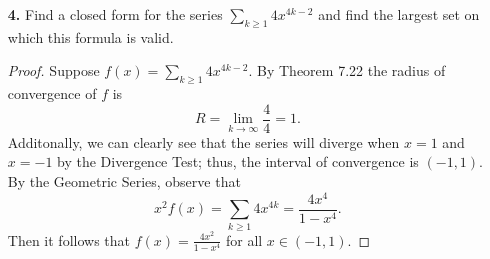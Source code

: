 \documentclass[ 12pt ]{article}
\begin{document}
\begin{enumerate}
	\item[\textbf{4.}] Find a closed form for the series $\sum_{k \geq 1} 4x^{4k - 2}$ and find the largest set on which this formula is valid.

		\begin{proof}
			Suppose $f(x) = \sum_{k \geq 1} 4x^{4k - 2}$. By Theorem 7.22 the radius of convergence of $f$ is $$R = \lim_{k \to \infty} \frac{4}{4} = 1.$$ Additonally, we can clearly see
			that the series will diverge when $x = 1$ and $x = -1$ by the Divergence Test; thus, the interval of convergence is $(-1, 1)$. By the Geometric Series, observe that
			$$x^2f(x) = \sum_{k \geq 1} 4x^{4k} = \frac{4x^4}{1 - x^4}.$$ Then it follows that $f(x) = \frac{4x^2}{1 - x^4}$ for all $x \in (-1, 1)$.
		\end{proof}

\end{enumerate}
\end{document}
